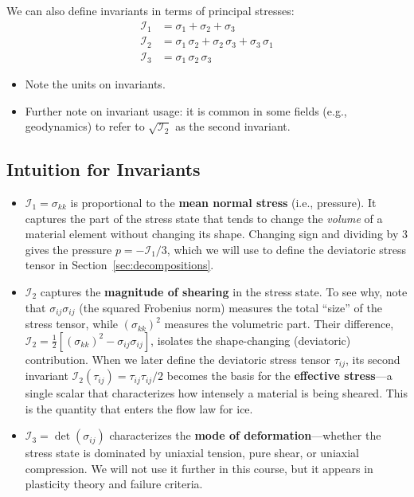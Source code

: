 \documentclass[11pt]{article}
\begin{document}
We can also define invariants in terms of principal stresses:
\begin{align}
  \mathcal{I}_1 &= \sigma_1 + \sigma_2 + \sigma_3 \\
  \mathcal{I}_2 &= \sigma_1\,\sigma_2 + \sigma_2\,\sigma_3 + \sigma_3\,\sigma_1 \\
  \mathcal{I}_3 &= \sigma_1\,\sigma_2\,\sigma_3
\end{align}

\begin{itemize}
  \item Note the units on invariants.
  \item Further note on invariant usage: it is common in some fields (e.g., geodynamics) to refer to $\sqrt{\mathcal{I}_2}$ as the second invariant.
\end{itemize}

\subsection{Intuition for Invariants}

\begin{itemize}
  \item $\mathcal{I}_1 = \sigma_{kk}$ is proportional to the \textbf{mean normal stress} (i.e., pressure).  It captures the part of the stress state that tends to change the \emph{volume} of a material element without changing its shape.  Changing sign and dividing by 3 gives the pressure $p = -\mathcal{I}_1/3$, which we will use to define the deviatoric stress tensor in Section~\ref{sec:decompositions}.

  \item $\mathcal{I}_2$ captures the \textbf{magnitude of shearing} in the stress state.  To see why, note that $\sigma_{ij}\sigma_{ij}$ (the squared Frobenius norm) measures the total ``size'' of the stress tensor, while $(\sigma_{kk})^2$ measures the volumetric part.  Their difference, $\mathcal{I}_2 = \tfrac{1}{2}[(\sigma_{kk})^2 - \sigma_{ij}\sigma_{ij}]$, isolates the shape-changing (deviatoric) contribution.  When we later define the deviatoric stress tensor $\tau_{ij}$, its second invariant $\mathcal{I}_2(\tau_{ij}) = \tau_{ij}\tau_{ij}/2$ becomes the basis for the \textbf{effective stress}---a single scalar that characterizes how intensely a material is being sheared.  This is the quantity that enters the flow law for ice.

  \item $\mathcal{I}_3 = \det(\sigma_{ij})$ characterizes the \textbf{mode of deformation}---whether the stress state is dominated by uniaxial tension, pure shear, or uniaxial compression.  We will not use it further in this course, but it appears in plasticity theory and failure criteria.
\end{itemize}
\end{document}
